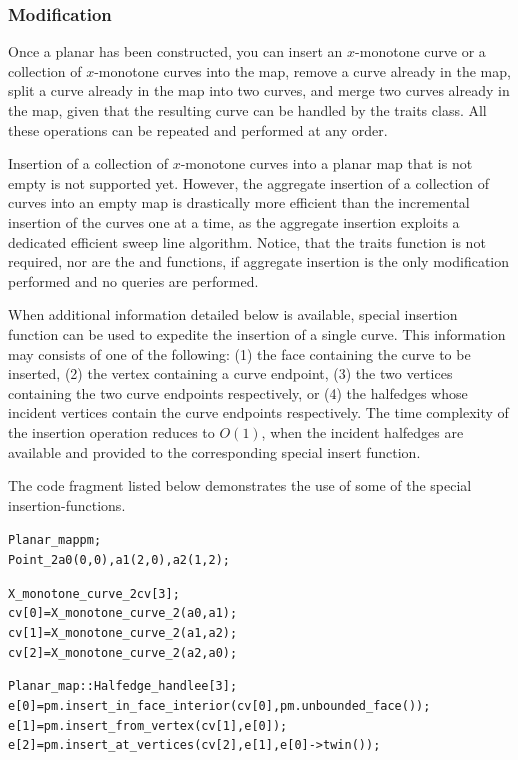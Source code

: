 \subsubsection{Modification}
Once a planar has been constructed, you can insert an $x$-monotone
curve or a collection of $x$-monotone curves into the map, remove a
curve already in the map, split a curve already in the map into two
curves, and merge two curves already in the map, given that the
resulting curve can be handled by the traits class. All these
operations can be repeated and performed at any order.

Insertion of a collection of $x$-monotone curves into a planar map
that is not empty is not supported yet. However, the aggregate
insertion of a collection of curves into an empty map is drastically
more efficient than the incremental insertion of the curves one at a
time, as the aggregate insertion exploits a dedicated efficient sweep
line algorithm. Notice, that the traits function
 is not required, nor are the
 and 
functions, if aggregate insertion is the only modification performed
and no queries are performed. 



When additional information detailed below is available, special
insertion function can be used to expedite the insertion of a single
curve. This information may consists of one of the following: (1) the
face containing the curve to be inserted, (2) the vertex containing a
curve endpoint, (3) the two vertices containing the two curve
endpoints respectively, or (4) the halfedges whose incident vertices
contain the curve endpoints respectively. The time complexity of the
insertion operation reduces to $O(1)$, when the incident halfedges are
available and provided to the corresponding special insert function.

The code fragment listed below demonstrates the use of some of the
special insertion-functions.

\begin{alltt}
  Planar_map pm;
  Point_2 a0(0, 0), a1(2, 0), a2(1, 2);

  X_monotone_curve_2 cv[3];
  cv[0] = X_monotone_curve_2(a0, a1);
  cv[1] = X_monotone_curve_2(a1, a2);
  cv[2] = X_monotone_curve_2(a2, a0);

  Planar_map::Halfedge_handle e[3];  
  e[0] = pm.insert_in_face_interior(cv[0], pm.unbounded_face());
  e[1] = pm.insert_from_vertex(cv[1], e[0]);
  e[2] = pm.insert_at_vertices(cv[2], e[1], e[0]->twin());
\end{alltt}

